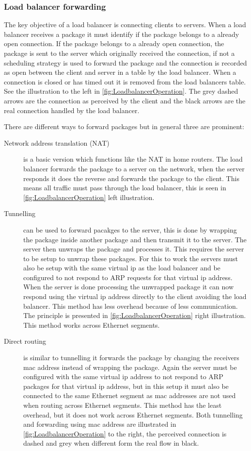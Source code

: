\subsubsection{Load balancer forwarding}
The key objective of a load balancer is connecting clients to servers.
When a load balancer receives a package it must identify if the package belongs to a already open connection.
If the package belongs to a already open connection, the package is sent to the server which originally received the connection, if not a scheduling strategy is used to forward the package and the connection is recorded as open between the client and server in a table by the load balancer.
When a connection is closed or has timed out it is removed from the load balancers table. See the illustration to the left in \cref{fig:LoadbalancerOperation}. The grey dashed arrows are the connection as perceived by the client and the black arrows are the real connection handled by the load balancer.

There are different ways to forward packages but in general three are prominent:
\begin{description}
	\item[Network address translation (NAT)] is a basic version which functions like the NAT in home routers.
	The load balancer forwards the package to a server on the network, when the server responds it does the reverse and forwards the package to the client.
	This means all traffic must pass through the load balancer, this is seen in \cref{fig:LoadbalancerOperation} left illustration. 
	
	\item[Tunnelling] can be used to forward pacakges to the server, this is done by wrapping the package inside another package and then transmit it to the server.
	The server then unwraps the package and processes it. This requires the server to be setup to unwrap these packages.
	For this to work the servers must also be setup with the same virtual ip as the load balancer and be configured to not respond to ARP requests for that virtual ip address.
	When the server is done processing the unwrapped package it can now respond using the virtual ip address directly to the client avoiding the load balancer.
	This method has less overhead because of less communication. The principle is presented in \cref{fig:LoadbalancerOperation} right illustration.
	This method works across Ethernet segments.
	
	\item[Direct routing] is similar to tunnelling it forwards the package by changing the receivers mac address instead of wrapping the package.
	Again the server must be configured with the same virtual ip address to not respond to ARP packages for that virtual ip address, but in this setup it must also be connected to the same Ethernet segment as mac addresses are not used when routing across Ethernet segments.
	This method has the least overhead, but it does not work across Ethernet segments.
	Both tunnelling and forwarding using mac address are illustrated in \cref{fig:LoadbalancerOperation} to the right, the perceived connection is dashed and grey when different form the real flow in black.
	
\end{description}

